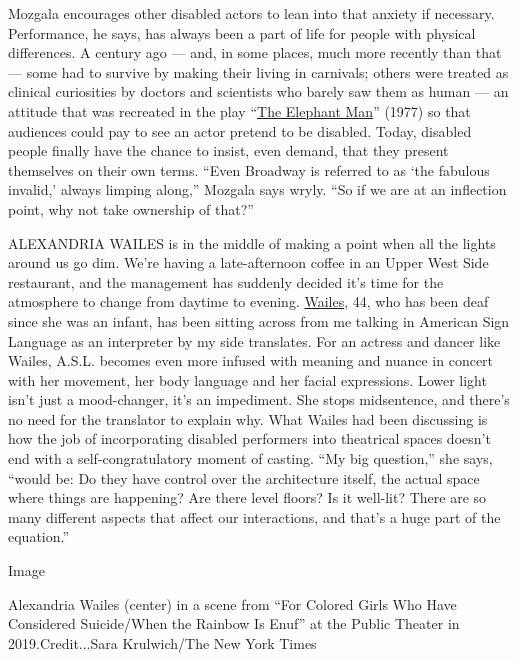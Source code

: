 Mozgala encourages other disabled actors to lean into that anxiety if
necessary. Performance, he says, has always been a part of life for
people with physical differences. A century ago --- and, in some places,
much more recently than that --- some had to survive by making their
living in carnivals; others were treated as clinical curiosities by
doctors and scientists who barely saw them as human --- an attitude that
was recreated in the play
``\href{https://www.nytimes3xbfgragh.onion/1979/01/15/archives/stage-the-elephant-man-a-parable-of-man.html}{The
Elephant Man}'' (1977) so that audiences could pay to see an actor
pretend to be disabled. Today, disabled people finally have the chance
to insist, even demand, that they present themselves on their own terms.
``Even Broadway is referred to as `the fabulous invalid,' always limping
along,'' Mozgala says wryly. ``So if we are at an inflection point, why
not take ownership of that?''

ALEXANDRIA WAILES is in the middle of making a point when all the lights
around us go dim. We're having a late-afternoon coffee in an Upper West
Side restaurant, and the management has suddenly decided it's time for
the atmosphere to change from daytime to evening.
\href{https://www.nytimes3xbfgragh.onion/2019/11/19/arts/dance/alexandria-wailes-deaf-dancer-for-colored-girls.html}{Wailes},
44, who has been deaf since she was an infant, has been sitting across
from me talking in American Sign Language as an interpreter by my side
translates. For an actress and dancer like Wailes, A.S.L. becomes even
more infused with meaning and nuance in concert with her movement, her
body language and her facial expressions. Lower light isn't just a
mood-changer, it's an impediment. She stops midsentence, and there's no
need for the translator to explain why. What Wailes had been discussing
is how the job of incorporating disabled performers into theatrical
spaces doesn't end with a self-congratulatory moment of casting. ``My
big question,'' she says, ``would be: Do they have control over the
architecture itself, the actual space where things are happening? Are
there level floors? Is it well-lit? There are so many different aspects
that affect our interactions, and that's a huge part of the equation.''

Image

Alexandria Wailes (center) in a scene from ``For Colored Girls Who Have
Considered Suicide/When the Rainbow Is Enuf'' at the Public Theater in
2019.Credit...Sara Krulwich/The New York Times


